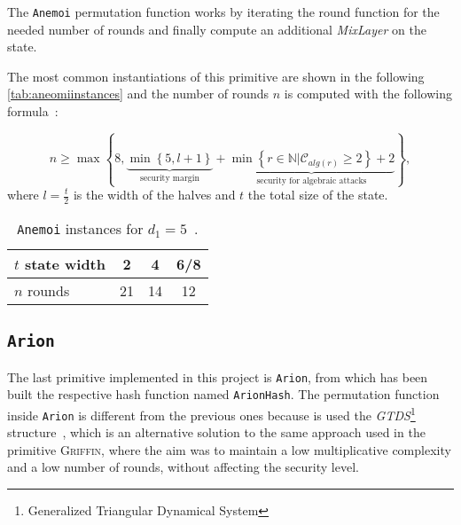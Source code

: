\documentclass[12pt, a4paper]{report}
\begin{document}
The \texttt{Anemoi} permutation function works by iterating the round function for the needed number of rounds and finally compute an additional \textit{MixLayer} on the state.

The most common instantiations of this primitive are shown in the following \autoref{tab:aneomiinstances} and the number of rounds $n$ is computed with the following formula~\cite[Eq.~(2)]{anemoi}:

\begin{equation}
  n \ge \max \left\{ 8, \underbrace{\min \left\{ 5, l+1 \right\}}_{\text{security margin}} + \underbrace{\min \left\{ r \in \mathbb{N} | \mathcal{C}_{alg(r)} \ge 2 \right\} + 2}_{\text{security for algebraic attacks}} \right\} ,
  \label{eq:anemoirounds}
\end{equation}
where $l = \frac{t}{2}$ is the width of the halves and $t$ the total size of the state.

\begin{table}[H]
  \caption{\texttt{Anemoi} instances for $d_1 = 5$~\cite[Tab.~1]{anemoi}.}\label{tab:aneomiinstances}
  \begin{center}
    \begin{tabular}{|l|c|c|c|}
      \hline
      $t$ state width & 2 & 4 & 6/8 \\
      \hline
      $n$ rounds & 21 & 14 & 12 \\
      \hline
    \end{tabular}
  \end{center}
\end{table}

\subsection{\texttt{Arion}}\label{subsec:arion}

The last primitive implemented in this project is \texttt{Arion}, from which has been built the respective hash function named \texttt{ArionHash}.
The permutation function inside \texttt{Arion} is different from the previous ones because is used the \textit{GTDS}\footnote{Generalized Triangular Dynamical System} structure~\cite{gtds}, which is an alternative solution to the same approach used in the primitive \textsc{Griffin}, where the aim was to maintain a low multiplicative complexity and a low number of rounds, without affecting the security level.
\end{document}

